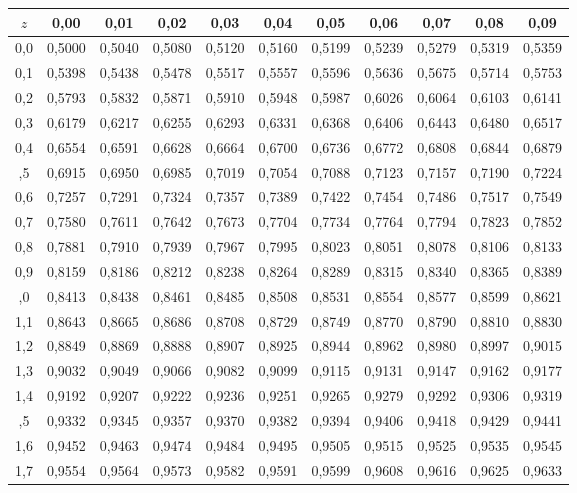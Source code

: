 \begin{tabular}{@{}c|*{10}{c}@{}}\toprule
$z$ & 0,00 & 0,01 & 0,02 & 0,03 & 0,04 & 0,05 & 0,06 & 0,07 & 0,08 & 0,09\\\midrule
0,0 & 0,5000 & 0,5040 & 0,5080 & 0,5120 & 0,5160 & 0,5199 & 0,5239 & 0,5279 & 0,5319 & 0,5359\\
0,1 & 0,5398 & 0,5438 & 0,5478 & 0,5517 & 0,5557 & 0,5596 & 0,5636 & 0,5675 & 0,5714 & 0,5753\\
0,2 & 0,5793 & 0,5832 & 0,5871 & 0,5910 & 0,5948 & 0,5987 & 0,6026 & 0,6064 & 0,6103 & 0,6141\\
0,3 & 0,6179 & 0,6217 & 0,6255 & 0,6293 & 0,6331 & 0,6368 & 0,6406 & 0,6443 & 0,6480 & 0,6517\\
0,4 & 0,6554 & 0,6591 & 0,6628 & 0,6664 & 0,6700 & 0,6736 & 0,6772 & 0,6808 & 0,6844 & 0,6879\\
\addlinespace[2pt]
0,5 & 0,6915 & 0,6950 & 0,6985 & 0,7019 & 0,7054 & 0,7088 & 0,7123 & 0,7157 & 0,7190 & 0,7224\\
0,6 & 0,7257 & 0,7291 & 0,7324 & 0,7357 & 0,7389 & 0,7422 & 0,7454 & 0,7486 & 0,7517 & 0,7549\\
0,7 & 0,7580 & 0,7611 & 0,7642 & 0,7673 & 0,7704 & 0,7734 & 0,7764 & 0,7794 & 0,7823 & 0,7852\\
0,8 & 0,7881 & 0,7910 & 0,7939 & 0,7967 & 0,7995 & 0,8023 & 0,8051 & 0,8078 & 0,8106 & 0,8133\\
0,9 & 0,8159 & 0,8186 & 0,8212 & 0,8238 & 0,8264 & 0,8289 & 0,8315 & 0,8340 & 0,8365 & 0,8389\\
\addlinespace[2pt]
1,0 & 0,8413 & 0,8438 & 0,8461 & 0,8485 & 0,8508 & 0,8531 & 0,8554 & 0,8577 & 0,8599 & 0,8621\\
1,1 & 0,8643 & 0,8665 & 0,8686 & 0,8708 & 0,8729 & 0,8749 & 0,8770 & 0,8790 & 0,8810 & 0,8830\\
1,2 & 0,8849 & 0,8869 & 0,8888 & 0,8907 & 0,8925 & 0,8944 & 0,8962 & 0,8980 & 0,8997 & 0,9015\\
1,3 & 0,9032 & 0,9049 & 0,9066 & 0,9082 & 0,9099 & 0,9115 & 0,9131 & 0,9147 & 0,9162 & 0,9177\\
1,4 & 0,9192 & 0,9207 & 0,9222 & 0,9236 & 0,9251 & 0,9265 & 0,9279 & 0,9292 & 0,9306 & 0,9319\\
\addlinespace[2pt]
1,5 & 0,9332 & 0,9345 & 0,9357 & 0,9370 & 0,9382 & 0,9394 & 0,9406 & 0,9418 & 0,9429 & 0,9441\\
1,6 & 0,9452 & 0,9463 & 0,9474 & 0,9484 & 0,9495 & 0,9505 & 0,9515 & 0,9525 & 0,9535 & 0,9545\\
1,7 & 0,9554 & 0,9564 & 0,9573 & 0,9582 & 0,9591 & 0,9599 & 0,9608 & 0,9616 & 0,9625 & 0,9633\\

\end{tabular}

